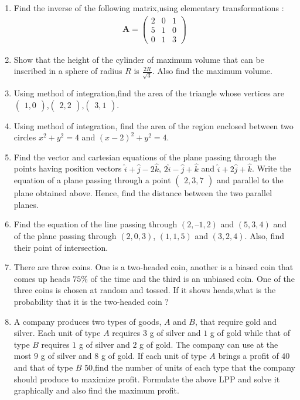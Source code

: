 \documentclass[12pt,-letter paper]{article}
\providecommand{\brak}[1]{\ensuremath{\left(#1\right)}}
\theoremstyle{remark}
\newcommand{\myvec}[1]{\ensuremath{\begin{pmatrix}#1\end{pmatrix}}}
\let\vec\mathbf
\begin{document}
\begin{enumerate}
        \item Find the inverse of the following matrix,using elementary transformations :
                \begin{align*}
                {\vec{A}} = \myvec{2&0&1\\5&1&0\\ 0&1&3}
                \end{align*}
                
        \item Show that the height of the cylinder of maximum volume that can be inscribed in a sphere of radius $R$ is $\frac{2R}{\sqrt{3}}$. Also find the maximum volume.
        
        \item Using method of integration,find the area of the triangle whose vertices are $\myvec{1,0}$,$\myvec{2,2}$,$\myvec{3,1}$.
        
        \item Using method of integration, find the area of the region enclosed between two circles ${x^2+y^2=4}$ and $\brak{x-2}^2+{y^2}=4$.
        
        \item Find the vector and cartesian equations of the plane passing through the points having position vectors $\hat{i}+\hat{j}-2\hat{k}$, $2\hat{i}-\hat{j}+\hat{k}$ and $\hat{i}+2\hat{j}+\hat{k}$. Write the equation of a plane passing through a point \myvec{2, 3, 7} and parallel to the plane obtained above. Hence, find the distance between the two parallel planes.
        
        \item Find the equation of the line passing through \brak{2, – 1, 2} and \brak{5, 3, 4} and of the plane passing through \brak{2, 0, 3}, \brak{1, 1, 5} and \brak{3, 2, 4}. Also, find their point of intersection.

\item There are three coins. One is a two-headed coin, another is a biased coin that comes up heads $75\%$ of the time and the third is an unbiased coin. One of the three coins is chosen at random and tossed. If it shows heads,what is the probability that it is the two-headed coin ?

\item A company produces two types of goods, $A$ and $B$, that require gold and silver. Each unit of type $A$ requires $3$ g of silver and $1$ g of gold while that of type $B$ requires $1$ g of silver and $2$ g of gold. The company can use at the most $9$ g of silver and $8$ g of gold. If each unit of type $A$ brings a profit of \rupee $40$ and that of type $B$ \rupee $50$,find the number of units of each type that the company should produce to maximize profit. Formulate the above LPP and solve it graphically and also find the maximum profit.


\end{enumerate}
\end{document}
